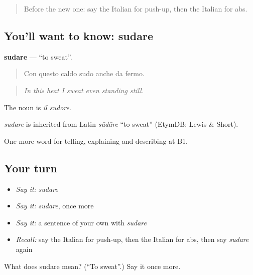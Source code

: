 \label{lesson:IT-C508-sudare}



\begin{quote}
Before the new one: say the Italian for push-up, then the Italian for abs.
\end{quote}

\subsection*{You'll want to know: sudare}
\textbf{sudare} — \textquotedblleft{}to sweat\textquotedblright{}.

\begin{quote}
Con questo caldo sudo anche da fermo.
\end{quote}

\begin{quote}
\emph{In this heat I sweat even standing still.}
\end{quote}

The noun is \emph{il sudore}.

\begin{cousinweb}
\emph{sudare} is inherited from Latin \emph{sūdāre} \textquotedblleft{}to sweat\textquotedblright{} (EtymDB; Lewis \& Short).
\end{cousinweb}

\begin{grammarlens}[title={What you've built}]
One more word for telling, explaining and describing at B1.
\end{grammarlens}

\subsection*{Your turn}
\begin{itemize}
\raggedright
  \item \emph{Say it:} \emph{sudare}
  \item \emph{Say it:} \emph{sudare}, once more
  \item \emph{Say it:} a sentence of your own with \emph{sudare}
  \item \emph{Recall:} say the Italian for push-up, then the Italian for abs, then say \emph{sudare} again
\end{itemize}

\begin{tcolorbox}[breakable,colback=teal!4,colframe=teal!35!black,title={Before you move on}]
What does sudare mean? (\textquotedblleft{}To sweat\textquotedblright{}.) Say it once more.
\end{tcolorbox}
